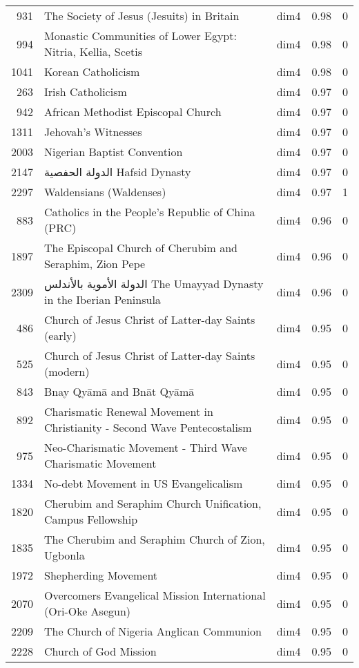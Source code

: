 \begin{tabular}{rllrr}
931 & The Society of Jesus (Jesuits) in Britain & dim4 & 0.98 & 0 \\
994 & Monastic Communities of Lower Egypt: Nitria, Kellia, Scetis & dim4 & 0.98 & 0 \\
1041 & Korean Catholicism & dim4 & 0.98 & 0 \\
263 & Irish Catholicism & dim4 & 0.97 & 0 \\
942 & African Methodist Episcopal Church & dim4 & 0.97 & 0 \\
1311 & Jehovah's Witnesses & dim4 & 0.97 & 0 \\
2003 & Nigerian Baptist Convention & dim4 & 0.97 & 0 \\
2147 & الدولة الحفصية Hafsid Dynasty & dim4 & 0.97 & 0 \\
2297 & Waldensians (Waldenses) & dim4 & 0.97 & 1 \\
883 & Catholics in the People's Republic of China (PRC) & dim4 & 0.96 & 0 \\
1897 & The Episcopal Church of Cherubim and Seraphim, Zion Pepe & dim4 & 0.96 & 0 \\
2309 & الدولة الأموية بالأندلس The Umayyad Dynasty in the Iberian Peninsula & dim4 & 0.96 & 0 \\
486 & Church of Jesus Christ of Latter-day Saints (early) & dim4 & 0.95 & 0 \\
525 & Church of Jesus Christ of Latter-day Saints (modern) & dim4 & 0.95 & 0 \\
843 & Bnay Qyāmā and Bnāt Qyāmā & dim4 & 0.95 & 0 \\
892 & Charismatic Renewal Movement in Christianity - Second Wave Pentecostalism & dim4 & 0.95 & 0 \\
975 & Neo-Charismatic Movement - Third Wave Charismatic Movement & dim4 & 0.95 & 0 \\
1334 & No-debt Movement in US Evangelicalism & dim4 & 0.95 & 0 \\
1820 & Cherubim and Seraphim Church Unification, Campus Fellowship & dim4 & 0.95 & 0 \\
1835 & The Cherubim and Seraphim Church of Zion, Ugbonla & dim4 & 0.95 & 0 \\
1972 & Shepherding Movement & dim4 & 0.95 & 0 \\
2070 & Overcomers Evangelical Mission International (Ori-Oke Asegun) & dim4 & 0.95 & 0 \\
2209 & The Church of Nigeria Anglican Communion & dim4 & 0.95 & 0 \\
2228 & Church of God Mission & dim4 & 0.95 & 0 \\

\end{tabular}
